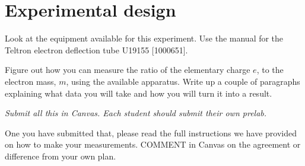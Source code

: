 \documentclass{tufte-handout}
\begin{document}
\begin{enumerate}



\end{enumerate}

\section{Experimental design}

Look at the equipment available for this experiment. Use the manual for the Teltron electron deflection tube 
U19155 [1000651].

Figure out how you can measure the ratio of the elementary charge $e$, to the electron mass, $m$, using the available apparatus.  Write up a couple of paragraphs explaining what data you will take and how you will turn it into a result.

{\it Submit all this in Canvas. Each student should submit their own prelab.}

One you have submitted that, please read the full instructions we have provided on how to make your measurements.  COMMENT in Canvas on the agreement or difference from your own plan.
\end{document}
